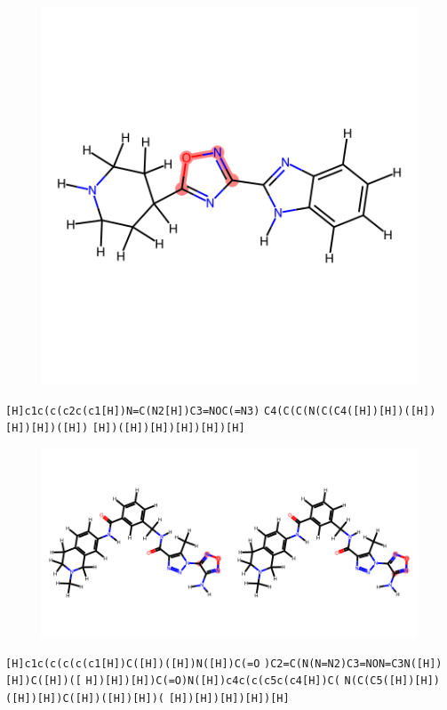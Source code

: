 \documentclass{article}
\begin{document}
\begin{figure}[ht]
\centering
    \includegraphics{mol22.png}
\end{figure}
\verb|[H]c1c(c(c2c(c1[H])N=C(N2[H])C3=NOC(=N3)| \verb|C4(C(C(N(C(C4([H])[H])([H])[H])[H])([H])| \verb|[H])([H])[H])[H])[H])[H]|

\begin{figure}[ht]
\centering
    \includegraphics{mol23.png}
\end{figure}
\verb|[H]c1c(c(c(c(c1[H])C([H])([H])N([H])C(=O| \verb|)C2=C(N(N=N2)C3=NON=C3N([H])[H])C([H])([| \verb|H])[H])[H])C(=O)N([H])c4c(c(c5c(c4[H])C(| \verb|N(C(C5([H])[H])([H])[H])C([H])([H])[H])(| \verb|[H])[H])[H])[H])[H]|
\end{document}
